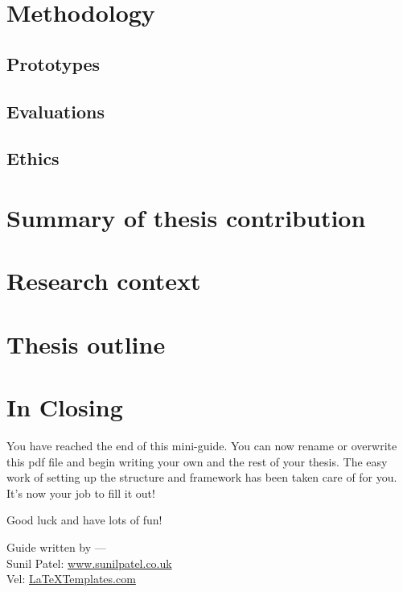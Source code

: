 \section{Methodology}
\subsection{Prototypes}
\subsection{Evaluations}
\subsection{Ethics}

\section{Summary of thesis contribution}
\section{Research context}
\section{Thesis outline}

\section{In Closing}

You have reached the end of this mini-guide. You can now rename or overwrite this pdf file and begin writing your own  and the rest of your thesis. The easy work of setting up the structure and framework has been taken care of for you. It's now your job to fill it out!

Good luck and have lots of fun!

\begin{flushright}
Guide written by ---\\
Sunil Patel: \href{http://www.sunilpatel.co.uk}{www.sunilpatel.co.uk}\\
Vel: \href{http://www.LaTeXTemplates.com}{LaTeXTemplates.com}
\end{flushright}
